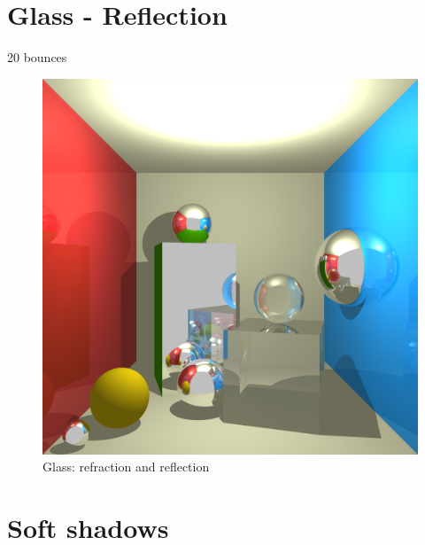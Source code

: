 \section{Glass - Reflection}
20 bounces
\begin{figure}[H]
\centering
\includegraphics[width=0.4\linewidth]{img/glass_awesome.png}
\caption{Glass: refraction and reflection}
\end{figure}


\section{Soft shadows}
